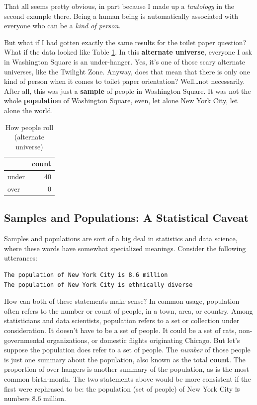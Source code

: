 \documentclass[openany]{book}
\begin{document}
That all seems pretty obvious, in part because I made up a \emph{tautology} in the second example there. Being a human being is automatically associated with everyone who can be a \emph{kind of person}.

But what if I had gotten exactly the same results for the toilet paper question? What if the data looked like Table \ref{tab:tp-redux}. In this \textbf{alternate universe}, everyone I ask in Washington Square is an under-hanger. Yes, it's one of those scary alternate universes, like the Twilight Zone. Anyway, does that mean that there is only one kind of person when it comes to toilet paper orientation? Well\ldots{}not necessarily. After all, this was just a \textbf{sample} of people in Washington Square. It was not the whole \textbf{population} of Washington Square, even, let alone New York City, let alone the world.

\begin{table}[!h]

\caption{\label{tab:tp-redux}How people roll (alternate universe)}
\centering
\begin{tabular}[t]{lr}
\toprule
  & count\\
\midrule
under & 40\\
over & 0\\
\bottomrule
\end{tabular}
\end{table}

\hypertarget{samples-and-populations-a-statistical-caveat}{%
\subsection*{Samples and Populations: A Statistical Caveat}\label{samples-and-populations-a-statistical-caveat}}

Samples and populations are sort of a big deal in statistics and data science, where these words have somewhat specialized meanings. Consider the following utterances:

\begin{verbatim}
The population of New York City is 8.6 million
The population of New York City is ethnically diverse
\end{verbatim}

How can both of these statements make sense? In common usage, population often refers to the number or count of people, in a town, area, or country. Among statisticians and data scientists, population refers to a set or collection under consideration. It doesn't have to be a set of people. It could be a set of rats, non-governmental organizations, or domestic flights originating Chicago. But let's suppose the population does refer to a set of people. The \emph{number} of those people is just one summary about the population, also known as the total \textbf{count}. The proportion of over-hangers is another summary of the population, as is the most-common birth-month. The two statements above would be more consistent if the first were rephrased to be: the population (set of people) of New York City \sout{is} numbers 8.6 million.
\end{document}
